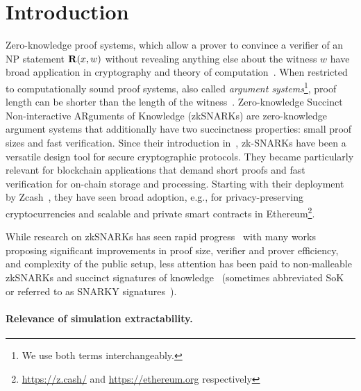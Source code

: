 \section{Introduction}
Zero-knowledge proof systems, which allow a prover to convince a verifier of an NP statement $\mathbf{R}(x,w)$ without revealing anything else about the witness $w$ have broad application in cryptography and theory of computation~\cite{FOCS:GolMicWig86,STOC:Fortnow87,C:BGGHKMR88}.
When restricted to computationally sound proof systems, also called \emph{argument systems}\footnote{We use both terms interchangeably.}, proof length can be shorter than the length of the witness~\cite{brassard1988minimum}. 
Zero-knowledge Succinct Non-interactive ARguments of Knowledge (zkSNARKs) are zero-knowledge argument systems that additionally have two succinctness properties: small proof sizes and fast verification. 
Since their introduction in~\cite{FOCS:Micali94}, zk-SNARKs have been a versatile design tool for secure cryptographic protocols. They became particularly relevant for blockchain applications that demand short proofs and fast verification for on-chain storage and processing. Starting with their deployment by Zcash~\cite{SP:BCGGMT14}, they have seen broad adoption, e.g., for privacy-preserving cryptocurrencies and scalable and private smart contracts in Ethereum\footnote{\url{https://z.cash/} and \url{https://ethereum.org} respectively}.


While research on zkSNARKs has seen rapid
progress~\cite{EC:GGPR13,AC:Groth10a,TCC:Lipmaa12,TCC:BCIOP13,SP:PHGR13,C:BCGTV13,AC:Lipmaa13,USENIX:BCTV14,EC:Groth16}
with many works proposing significant improvements in proof size, verifier and prover efficiency, and complexity of the public setup,
less attention has been paid to non-malleable zkSNARKs and succinct signatures of
knowledge~\cite{C:CamSta97,C:ChaLys06} (sometimes abbreviated SoK or referred to as SNARKY signatures~\cite{C:GroMal17,EPRINT:BKSV20}). 


\paragraph{Relevance of simulation extractability.}

